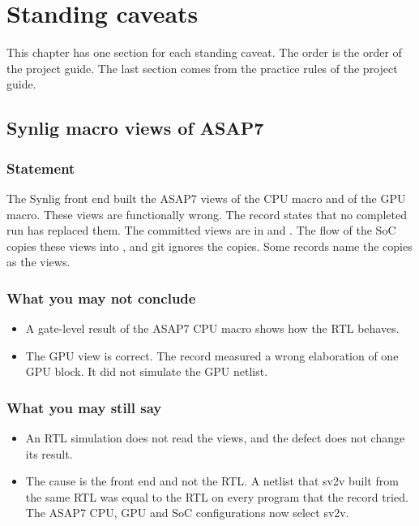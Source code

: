 \chapter{Standing caveats}\label{tm:ch:standing-caveats}

This chapter has one section for each standing caveat. The order is the order of the project guide. The last section comes from the practice rules of the project guide.

\section{Synlig macro views of ASAP7}\label{tm:caveat:synlig-macro-views}
\subsection*{Statement}
The Synlig front end built the ASAP7 views of the CPU macro and of the GPU macro. These views are functionally wrong. The record states that no completed run has replaced them. The committed views are in  and . The flow of the SoC copies these views into , and git ignores the copies. Some records name the copies as the views.

\subsection*{What you may not conclude}
\begin{itemize}
  \item A gate-level result of the ASAP7 CPU macro shows how the RTL behaves.
  \item The GPU view is correct. The record measured a wrong elaboration of one GPU block. It did not simulate the GPU netlist.
\end{itemize}

\subsection*{What you may still say}
\begin{itemize}
  \item An RTL simulation does not read the views, and the defect does not change its result.
  \item The cause is the front end and not the RTL. A netlist that sv2v built from the same RTL was equal to the RTL on every program that the record tried. The ASAP7 CPU, GPU and SoC configurations now select sv2v.
\end{itemize}

